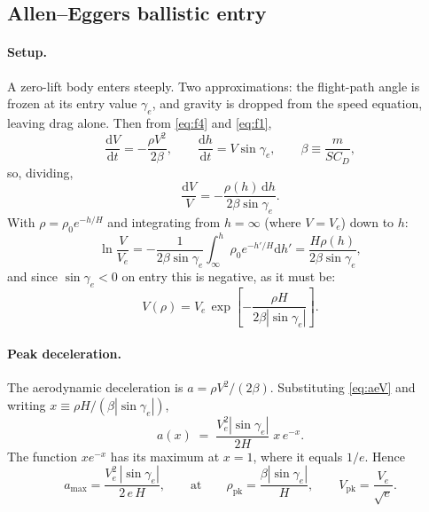 \documentclass[11pt]{article}
\newcommand{\dd}{\mathrm{d}}
\begin{document}
\subsection{Allen--Eggers ballistic entry}
\label{sec:allen}

\paragraph{Setup.} A zero-lift body enters steeply. Two approximations: the
flight-path angle is frozen at its entry value $\gamma_e$, and gravity is
dropped from the speed equation, leaving drag alone. Then from \eqref{eq:f4}
and \eqref{eq:f1},
\begin{equation}
  \frac{\dd V}{\dd t} = -\frac{\rho V^2}{2\beta}, \qquad
  \frac{\dd h}{\dd t} = V\sin\gamma_e, \qquad
  \beta \equiv \frac{m}{S C_D},
\end{equation}
so, dividing,
\begin{equation}
  \frac{\dd V}{V} = -\frac{\rho(h)\,\dd h}{2\beta\sin\gamma_e} .
\end{equation}
With $\rho = \rho_0 e^{-h/H}$ and integrating from $h=\infty$ (where
$V = V_e$) down to $h$:
\begin{equation}
  \ln\frac{V}{V_e}
  = -\frac{1}{2\beta\sin\gamma_e}\int_{\infty}^{h}\rho_0 e^{-h'/H}\dd h'
  = \frac{H\rho(h)}{2\beta\sin\gamma_e} ,
\end{equation}
and since $\sin\gamma_e<0$ on entry this is negative, as it must be:
\begin{equation}
  V(\rho) = V_e\,\exp\!\left[-\frac{\rho H}{2\beta|\sin\gamma_e|}\right].
  \label{eq:aeV}
\end{equation}

\paragraph{Peak deceleration.} The aerodynamic deceleration is
$a = \rho V^2/(2\beta)$. Substituting \eqref{eq:aeV} and writing
$x \equiv \rho H/(\beta|\sin\gamma_e|)$,
\begin{equation}
  a(x) \;=\; \frac{V_e^2|\sin\gamma_e|}{2H}\;x\,e^{-x} .
  \label{eq:aeax}
\end{equation}
The function $xe^{-x}$ has its maximum at $x=1$, where it equals $1/e$. Hence
\begin{equation}
  a_{\max} = \frac{V_e^2\,|\sin\gamma_e|}{2\,e\,H},
  \qquad\text{at}\qquad
  \rho_{\text{pk}} = \frac{\beta|\sin\gamma_e|}{H},
  \qquad
  V_{\text{pk}} = \frac{V_e}{\sqrt{e}} .
  \label{eq:allen}
\end{equation}
\end{document}
